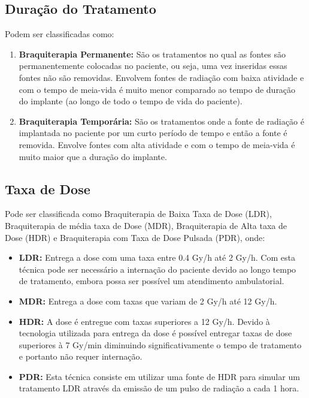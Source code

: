 \documentclass[11pt,a4paper]{article}
\begin{document}
		\subsection{Duração do Tratamento}

			Podem ser classificadas como:

			\begin{enumerate}

				\item \textbf{Braquiterapia Permanente:}  São os tratamentos no qual as fontes são permanentemente colocadas no paciente, ou seja, uma vez inseridas essas fontes não são removidas. Envolvem fontes de radiação com baixa atividade e com o tempo de meia-vida é muito menor comparado ao tempo de duração do implante (ao longo de todo o tempo de vida do paciente).
				
				\item \textbf{Braquiterapia Temporária:} São os tratamentos onde a fonte de radiação é implantada no paciente por um curto período de tempo e então a fonte é removida. Envolve fontes com alta atividade e com o tempo de meia-vida é muito maior que a duração do implante.
				
			\end{enumerate}

		\subsection{Taxa de Dose}

			Pode ser classificada como Braquiterapia de Baixa Taxa de Dose (LDR), Braquiterapia de média taxa de Dose (MDR), Braquiterapia de Alta taxa de Dose (HDR) e Braquiterapia com Taxa de Dose Pulsada (PDR), onde:

			\begin{itemize}
				\item \textbf{LDR:} Entrega a dose com uma taxa entre 0.4 Gy/h até 2 Gy/h. Com esta técnica pode ser necessário a internação do paciente devido ao longo tempo de tratamento, embora possa ser possível um atendimento ambulatorial.
				\item \textbf{MDR:} Entrega a dose com taxas que variam de 2 Gy/h até 12 Gy/h.
				\item  \textbf{HDR:} A dose é entregue com taxas superiores a 12 Gy/h. Devido à tecnologia utilizada para entrega da dose é possível entregar taxas de dose superiores à 7 Gy/min diminuindo significativamente o tempo de tratamento e portanto não requer internação. 
				\item \textbf{PDR:} Esta técnica consiste em utilizar uma fonte de HDR para simular um tratamento LDR através da emissão de um pulso de radiação a cada 1 hora.
			\end{itemize}
\end{document}
